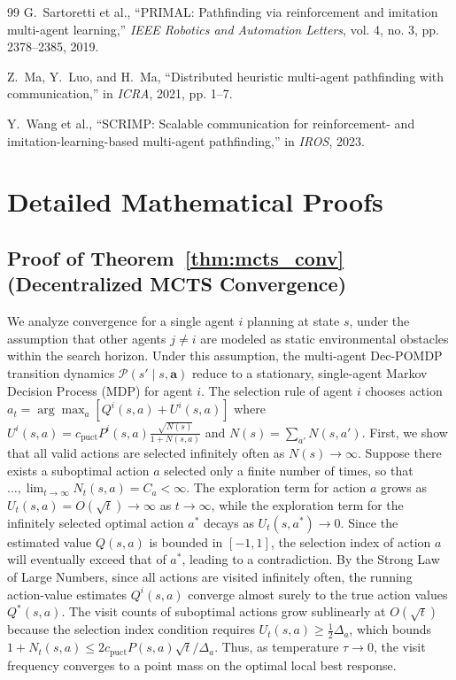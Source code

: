 \documentclass[11pt,a4paper]{article}
\begin{document}
\begin{thebibliography}{99}
G.~Sartoretti et al., ``PRIMAL: Pathfinding via reinforcement and imitation multi-agent learning,'' {\it IEEE Robotics and Automation Letters}, vol. 4, no. 3, pp. 2378--2385, 2019.

Z.~Ma, Y.~Luo, and H.~Ma, ``Distributed heuristic multi-agent pathfinding with communication,'' in {\it ICRA}, 2021, pp. 1--7.

Y.~Wang et al., ``SCRIMP: Scalable communication for reinforcement- and imitation-learning-based multi-agent pathfinding,'' in {\it IROS}, 2023.

\end{thebibliography}

\appendix
\section{Detailed Mathematical Proofs}

\subsection{Proof of Theorem~\ref{thm:mcts_conv} (Decentralized MCTS Convergence)}\label{app:proof_mcts_conv}
We analyze convergence for a single agent $i$ planning at state $s$, under the assumption that other agents $j \neq i$ are modeled as static environmental obstacles within the search horizon. Under this assumption, the multi-agent Dec-POMDP transition dynamics $\mathcal{P}(s' \mid s, \mathbf{a})$ reduce to a stationary, single-agent Markov Decision Process (MDP) for agent $i$.
The selection rule of agent $i$ chooses action $a_t = \arg\max_{a} [Q^i(s, a) + U^i(s, a)]$ where $U^i(s, a) = c_{\mathrm{puct}} P^i(s, a) \frac{\sqrt{N(s)}}{1 + N(s, a)}$ and $N(s) = \sum_{a'} N(s, a')$.
First, we show that all valid actions are selected infinitely often as $N(s) \to \infty$. Suppose there exists a suboptimal action $a$ selected only a finite number of times, so that $\dots, \lim_{t\to\infty} N_t(s, a) = C_a < \infty$. The exploration term for action $a$ grows as $U_t(s, a) = O(\sqrt{t}) \to \infty$ as $t \to \infty$, while the exploration term for the infinitely selected optimal action $a^*$ decays as $U_t(s, a^*) \to 0$. Since the estimated value $Q(s, a)$ is bounded in $[-1, 1]$, the selection index of action $a$ will eventually exceed that of $a^*$, leading to a contradiction.
By the Strong Law of Large Numbers, since all actions are visited infinitely often, the running action-value estimates $Q^i(s, a)$ converge almost surely to the true action values $Q^*(s, a)$. The visit counts of suboptimal actions grow sublinearly at $O(\sqrt{t})$ because the selection index condition requires $U_t(s, a) \geq \frac{1}{2} \Delta_a$, which bounds $1 + N_t(s, a) \leq 2 c_{\mathrm{puct}} P(s, a) \sqrt{t} / \Delta_a$. Thus, as temperature $\tau \to 0$, the visit frequency converges to a point mass on the optimal local best response.
\end{document}
